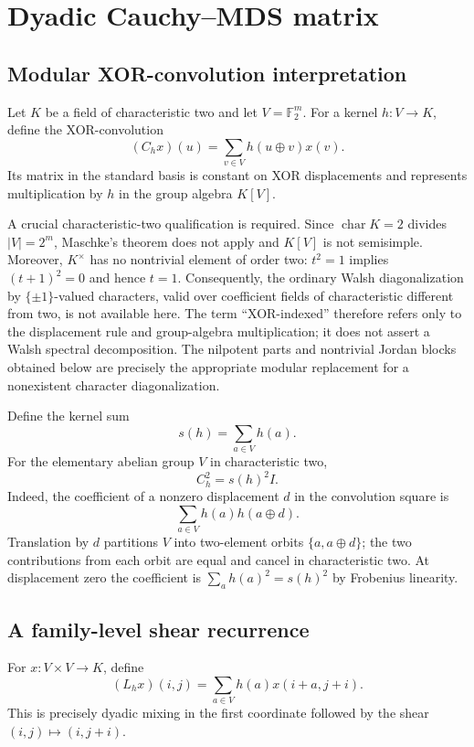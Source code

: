 \documentclass[10pt,reqno]{amsart}
\theoremstyle{plain}
\theoremstyle{remark}\newtheorem{remark}[theorem]{Remark}
\theoremstyle{definition}\newtheorem{definition}[theorem]{Definition}
\newcommand{\F}{\mathbb F}
\begin{document}
\section{Dyadic Cauchy--MDS matrix}\label{sec:walsh-meaning}
\subsection{Modular XOR-convolution interpretation}
Let $K$ be a field of characteristic two and let $V=\F_2^m$. For a kernel $h:V\to K$, define the XOR-convolution
\[
(C_hx)(u)=\sum_{v\in V}h(u\oplus v)x(v).
\]
Its matrix in the standard basis is constant on XOR displacements and represents multiplication by $h$ in the group algebra $K[V]$.

A crucial characteristic-two qualification is required. Since $\operatorname{char}K=2$ divides $|V|=2^m$, Maschke's theorem does not apply and $K[V]$ is not semisimple. Moreover, $K^\times$ has no nontrivial element of order two: $t^2=1$ implies $(t+1)^2=0$ and hence $t=1$. Consequently, the ordinary Walsh diagonalization by $\{\pm1\}$-valued characters, valid over coefficient fields of characteristic different from two, is not available here. The term ``XOR-indexed'' therefore refers only to the displacement rule and group-algebra multiplication; it does not assert a Walsh spectral decomposition. The nilpotent parts and nontrivial Jordan blocks obtained below are precisely the appropriate modular replacement for a nonexistent character diagonalization.

Define the kernel sum
\begin{equation}
 s(h)=\sum_{a\in V}h(a).
 \label{eq:kernel-sum}
\end{equation}
For the elementary abelian group $V$ in characteristic two,
\begin{equation}
 C_h^2=s(h)^2I.
 \label{eq:scalar-square}
\end{equation}
Indeed, the coefficient of a nonzero displacement $d$ in the convolution square is
\[
\sum_{a\in V}h(a)h(a\oplus d).
\]
Translation by $d$ partitions $V$ into two-element orbits $\{a,a\oplus d\}$; the two contributions from each orbit are equal and cancel in characteristic two. At displacement zero the coefficient is $\sum_a h(a)^2=s(h)^2$ by Frobenius linearity.

\subsection{A family-level shear recurrence}
For \(x:V\times V\to K\), define
\begin{equation}
(L_hx)(i,j)=\sum_{a\in V}h(a)x(i+a,j+i).
\label{eq:general-shear-operator}
\end{equation}
This is precisely dyadic mixing in the first coordinate followed by the shear \((i,j)\mapsto(i,j+i)\).
\end{document}
